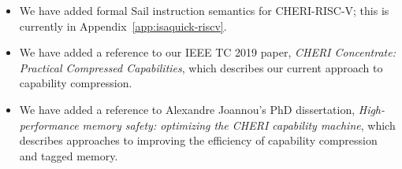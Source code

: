 \begin{itemize}
\item We have added formal Sail instruction semantics for CHERI-RISC-V; this
  is currently in Appendix~\ref{app:isaquick-riscv}.

\item We have added a reference to our IEEE TC 2019 paper, \textit{CHERI
  Concentrate: Practical Compressed Capabilities}, which describes our current
  approach to capability compression.

\item We have added a reference to Alexandre Joannou's PhD dissertation,
  \textit{High-perform\-ance memory safety: optimizing the CHERI capability
  machine}, which describes approaches to improving the efficiency of
  capability compression and tagged memory.

\end{itemize}
